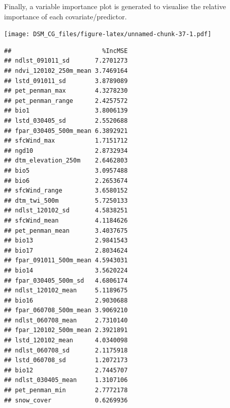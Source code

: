 \documentclass[
  10pt,
  b5paper,
  oneside]{book}
\newenvironment{Shaded}{\begin{snugshade}}{\end{snugshade}}
\newcommand{\AttributeTok}[1]{\textcolor[rgb]{0.77,0.63,0.00}{#1}}
\newcommand{\CommentTok}[1]{\textcolor[rgb]{0.56,0.35,0.01}{\textit{#1}}}
\newcommand{\DecValTok}[1]{\textcolor[rgb]{0.00,0.00,0.81}{#1}}
\newcommand{\DocumentationTok}[1]{\textcolor[rgb]{0.56,0.35,0.01}{\textbf{\textit{#1}}}}
\newcommand{\FunctionTok}[1]{\textcolor[rgb]{0.00,0.00,0.00}{#1}}
\newcommand{\NormalTok}[1]{#1}
\newcommand{\OtherTok}[1]{\textcolor[rgb]{0.56,0.35,0.01}{#1}}
\newcommand{\SpecialCharTok}[1]{\textcolor[rgb]{0.00,0.00,0.00}{#1}}
\begin{document}
Finally, a variable importance plot is generated to visualise the relative importance of each covariate/predictor.

\begin{Shaded}
\end{Shaded}

\texttt{[image: DSM\_CG\_files/figure-latex/unnamed-chunk-37-1.pdf]}

\begin{verbatim}
##                         %IncMSE
## ndlst_091011_sd       7.2701273
## ndvi_120102_250m_mean 3.7469164
## lstd_091011_sd        3.8789089
## pet_penman_max        4.3278230
## pet_penman_range      2.4257572
## bio1                  3.8006139
## lstd_030405_sd        2.5520688
## fpar_030405_500m_mean 6.3892921
## sfcWind_max           1.7151712
## ngd10                 2.8732934
## dtm_elevation_250m    2.6462803
## bio5                  3.0957488
## bio6                  2.2653674
## sfcWind_range         3.6580152
## dtm_twi_500m          5.7250133
## ndlst_120102_sd       4.5838251
## sfcWind_mean          4.1184626
## pet_penman_mean       3.4037675
## bio13                 2.9841543
## bio17                 2.8034624
## fpar_091011_500m_mean 4.5943031
## bio14                 3.5620224
## fpar_030405_500m_sd   4.6806174
## ndlst_120102_mean     5.1189675
## bio16                 2.9030688
## fpar_060708_500m_mean 3.9069210
## ndlst_060708_mean     2.7310140
## fpar_120102_500m_mean 2.3921891
## lstd_120102_mean      4.0340098
## ndlst_060708_sd       2.1175918
## lstd_060708_sd        1.2072173
## bio12                 2.7445707
## ndlst_030405_mean     1.3107106
## pet_penman_min        2.7772178
## snow_cover            0.6269936
\end{verbatim}
\end{document}
